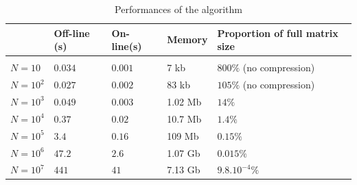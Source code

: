 \documentclass[smallextended]{svjour3}
\begin{document}
																																																		
\begin{table}[H]
	\centering
	\begin{tabular}{lllll}
		\centering
		           & \vline\quad Off-line (s) & On-line(s) & Memory  & Proportion of full matrix size \\
		\hline					 				
		           & \vline                   &            &         &                                \\ 
		$N = 10$   & \vline\quad $0.034$      & $0.001$    & 7 kb    & $800\%$ (no compression)       \\
		$N = 10^2$ & \vline\quad $0.027$      & $0.002$    & 83 kb   & $105\%$ (no compression)       \\
		$N = 10^3$ & \vline\quad $0.049$      & $0.003$    & 1.02 Mb & $14\%$                         \\
		$N = 10^4$ & \vline\quad $0.37$       & $0.02$     & 10.7 Mb & $1.4\%$                        \\
		$N = 10^5$ & \vline\quad $3.4$        & $0.16$     & 109 Mb  & $0.15\%$                       \\
		$N = 10^6$ & \vline\quad $47.2$       & $2.6$      & 1.07 Gb & $0.015\%$                      \\
		$N = 10^7$ & \vline\quad $441$        & $41$       & 7.13 Gb & $9.8.10^{-4}\%$                \\		
	\end{tabular}
	\caption{Performances of the algorithm}
	\label{tablePerf}
\end{table}	
																																																		
\end{document}
